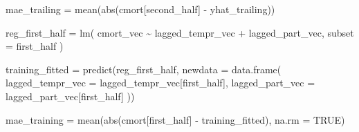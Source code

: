 \documentclass[
]{article}
\newenvironment{Shaded}{\begin{snugshade}}{\end{snugshade}}
\newcommand{\AttributeTok}[1]{\textcolor[rgb]{0.77,0.63,0.00}{#1}}
\newcommand{\ConstantTok}[1]{\textcolor[rgb]{0.00,0.00,0.00}{#1}}
\newcommand{\FunctionTok}[1]{\textcolor[rgb]{0.00,0.00,0.00}{#1}}
\newcommand{\NormalTok}[1]{#1}
\newcommand{\OtherTok}[1]{\textcolor[rgb]{0.56,0.35,0.01}{#1}}
\newcommand{\SpecialCharTok}[1]{\textcolor[rgb]{0.00,0.00,0.00}{#1}}
\begin{document}
\begin{Shaded}
\begin{Highlighting}[]
\NormalTok{mae\_trailing }\OtherTok{=} \FunctionTok{mean}\NormalTok{(}\FunctionTok{abs}\NormalTok{(cmort[second\_half] }\SpecialCharTok{{-}}\NormalTok{ yhat\_trailing))}

\NormalTok{reg\_first\_half }\OtherTok{=} \FunctionTok{lm}\NormalTok{(}
\NormalTok{  cmort\_vec }\SpecialCharTok{\textasciitilde{}}\NormalTok{ lagged\_tempr\_vec }\SpecialCharTok{+}\NormalTok{ lagged\_part\_vec,}
  \AttributeTok{subset =}\NormalTok{ first\_half}
\NormalTok{)}

\NormalTok{training\_fitted }\OtherTok{=} \FunctionTok{predict}\NormalTok{(reg\_first\_half, }\AttributeTok{newdata =} \FunctionTok{data.frame}\NormalTok{(}
  \AttributeTok{lagged\_tempr\_vec =}\NormalTok{ lagged\_tempr\_vec[first\_half],}
  \AttributeTok{lagged\_part\_vec =}\NormalTok{ lagged\_part\_vec[first\_half]}
\NormalTok{))}

\NormalTok{mae\_training }\OtherTok{=} \FunctionTok{mean}\NormalTok{(}\FunctionTok{abs}\NormalTok{(cmort[first\_half] }\SpecialCharTok{{-}}\NormalTok{ training\_fitted), }\AttributeTok{na.rm =} \ConstantTok{TRUE}\NormalTok{)}


\end{Highlighting}
\end{Shaded}
\end{document}
